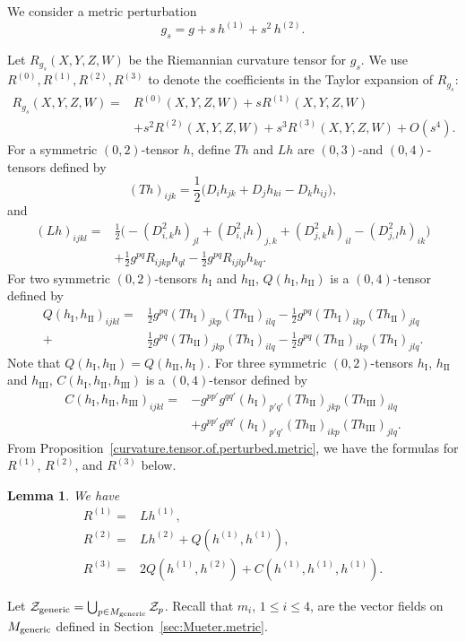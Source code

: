 \documentclass[11pt]{amsart}
\newtheorem{lemma}[theorem]{Lemma}
\theoremstyle{definition}
\begin{document}
\label{sec:formula.metric.perturbation}

We consider a metric perturbation
\[g_s = g + s \, h^{(1)} + s^2 \, h^{(2)}.\] 

Let $R_{g_s}(X,Y,Z,W)$ be the Riemannian curvature tensor for $g_s$.
We use $R^{(0)},R^{(1)},R^{(2)},R^{(3)}$ to denote the coefficients in the Taylor expansion of $R_{g_s}$:
\begin{align*}
R_{g_s}(X,Y,Z,W)=&R^{(0)}(X,Y,Z,W)+sR^{(1)}(X,Y,Z,W)\\
&+s^2R^{(2)}(X,Y,Z,W)+s^3R^{(3)}(X,Y,Z,W)+O(s^4). 
\end{align*}
For a symmetric $(0,2)$-tensor $h$, define $Th$ and $Lh$ are $(0,3)$-and $(0,4)$-tensors defined by
\[(Th)_{ijk}=\frac{1}{2}\big( D_i h_{jk}+D_j h_{ki}-D_k h_{ij} \big),\]
and
\begin{align*} 
(Lh)_{ijkl}=&\frac{1}{2}\big(- (D^2_{i,k}h)_{jl}+(D^2_{i,l} h)_{j,k}+(D^2_{j,k}h)_{il}-(D^2_{j,l}h)_{ik} \big)\\
&+\frac{1}{2}g^{pq}R_{ijkp}h_{ql}-\frac{1}{2}g^{pq}R_{ijlp}h_{kq}.    
\end{align*}
For two symmetric $(0,2)$-tensors $h_{\mathrm{I}}$ and $h_{\mathrm{II}}$, $Q(h_{\mathrm{I}},h_{\mathrm{II}})$ is a $(0,4)$-tensor defined by
\begin{align*}
Q(h_{\mathrm{I}},h_{\mathrm{II}})_{ijkl}=&\frac{1}{2}g^{pq}(Th_{\mathrm{I}})_{jkp}(Th_{\mathrm{II}})_{ilq}-\frac{1}{2}g^{pq}(Th_{\mathrm{I}})_{ikp}(Th_{\mathrm{II}})_{jlq}\\
+&\frac{1}{2}g^{pq}(Th_{\mathrm{II}})_{jkp}(Th_{\mathrm{I}})_{ilq}-\frac{1}{2}g^{pq}(Th_{\mathrm{II}})_{ikp}(Th_{\mathrm{I}})_{jlq}.    
\end{align*}
Note that $Q(h_{\mathrm{I}},h_{\mathrm{II}}) = Q(h_{\mathrm{II}},h_{\mathrm{I}})$. For three symmetric $(0,2)$-tensors $h_{\mathrm{I}}$, $h_{\mathrm{II}}$ and $h_{\mathrm{III}}$, $C(h_{\mathrm{I}},h_{\mathrm{II}},h_{\mathrm{III}})$ is a $(0,4)$-tensor defined by
\begin{align*}
C(h_{\mathrm{I}},h_{\mathrm{II}},h_{\mathrm{III}})_{ijkl}=&
-g^{pp'}g^{qq'}(h_{\mathrm{I}})_{p'q'}(Th_{\mathrm{II}})_{jkp}(Th_{\mathrm{III}})_{ilq}\\
&+g^{pp'}g^{qq'}(h_{\mathrm{I}})_{p'q'}(Th_{\mathrm{II}})_{ikp}(Th_{\mathrm{III}})_{jlq}.
\end{align*}
From Proposition~\ref{curvature.tensor.of.perturbed.metric}, we have the formulas for $R^{(1)}$, $R^{(2)}$, and $R^{(3)}$ below. 
\begin{lemma}
\label{curvature.tensor.expansion}
We have 
\begin{align*}
    R^{(1)}=&Lh^{(1)},\\
    R^{(2)}=&Lh^{(2)}+Q(h^{(1)},h^{(1)}),\\
    R^{(3)}=&2Q(h^{(1)},h^{(2)})+C(h^{(1)},h^{(1)},h^{(1)}).
\end{align*}
\end{lemma}
Let $\mathcal{Z}_{\text{\rm generic}} = \bigcup_{p \in M_{\text{\rm generic}}} \mathcal{Z}_p$.
Recall that $m_i$, $1 \leq i\leq 4$, are the vector fields on $M_{\text{\rm generic}}$ defined in Section~\ref{sec:Mueter.metric}.
\end{document}

